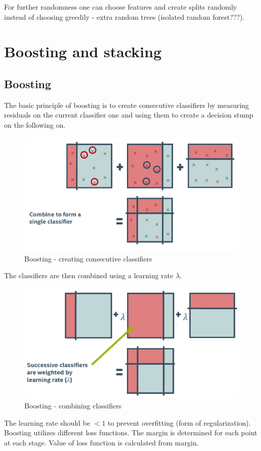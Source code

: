 \documentclass[11pt]{book}
\begin{document}
For further randomness one can choose features and create splits randomly instead of choosing greedily - extra random trees (isolated random forest???).

\section{Boosting and stacking}
\subsection{Boosting}
The basic principle of boosting is to create consecutive classifiers by measuring residuals on the current classifier one and using them to create a decision stump on the following on. 

\begin{figure}[H]
    \centering
    \includegraphics[width=0.5\linewidth]{boost1.PNG}
    \caption{Boosting - creating consecutive classifiers}
    \label{fig:my_label}
\end{figure}


The classifiers are then combined using a learning rate $\lambda$. 

\begin{figure}[H]
    \centering
    \includegraphics[width=0.5\linewidth]{boost2.PNG}
    \caption{Boosting - combining classifiers}
    \label{fig:my_label}
\end{figure}

The learning rate should be $< 1$ to prevent overfitting (form of regularization). Boosting utilizes different loss functions. The margin is determined for each point at each stage.  Value of loss function is calculated from margin.
\end{document}
